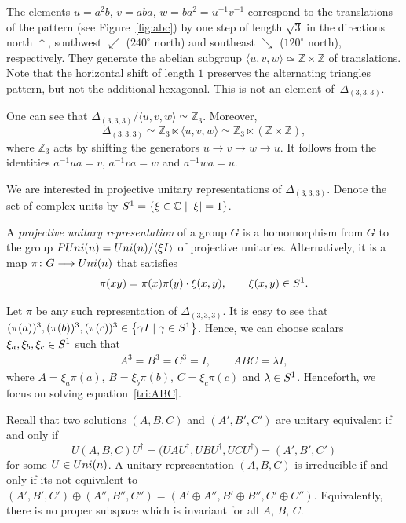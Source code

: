 \documentclass[11pt]{article}
\numberwithin{equation}{section}
\numberwithin{equation}{section}
\newcommand{\ea}[1]{\begin{align}#1\end{align}}
\newcommand{\la}{\langle}
\newcommand{\ra}{\rangle}
\newcommand{\mbb}{\mathbb}
\begin{document}
The elements $u=a^2b$, $v=aba$, $w=ba^2=u^{-1}v^{-1}$ correspond to the translations
of the pattern (see Figure~\ref{fig:abc}) by one step of length $\sqrt{3}$
in the directions north $\uparrow$,
southwest $\swarrow$ ($240^\circ$ north) and
southeast $\searrow$ ($120^\circ$ north), respectively.
They generate the abelian subgroup $\la u,v,w \ra \simeq \mbb{Z} \times \mbb{Z}$
of translations.
Note that the horizontal shift of length $1$ preserves the alternating triangles pattern,
but not the additional hexagonal. This is not an element of~$\Delta_{(3,3,3)}$.

One can see that
$\Delta_{(3,3,3)}/\la u,v,w \ra \simeq \mbb{Z}_3$.
Moreover,
\[
\Delta_{(3,3,3)} \simeq \mbb{Z}_3 \ltimes \la u,v,w \ra
\simeq \mbb{Z}_3 \ltimes (\mbb{Z} \times \mbb{Z}),
\]
where $\mbb{Z}_3$ acts by shifting the generators $u \rightarrow v \rightarrow w \rightarrow u$.
It follows from the identities $a^{-1}ua = v$, $a^{-1}va = w$ and $a^{-1}wa = u$.

We are interested in projective unitary representations of $\Delta_{(3,3,3)}$.
Denote the set of complex units by ${\rm S}^1 = \{\xi \in \mbb{C} \mid |\xi| = 1 \}$.

A \textit{projective unitary representation} of a group $G$
is a homomorphism from $G$ to the group
${\rm PUni}(n) = {\rm Uni}(n)/\la \xi I\ra$ of projective unitaries.
Alternatively, it is a map $\pi\colon G \longrightarrow {\rm Uni}(n)$ that satisfies
\begin{align*}
\pi(xy) = \pi(x)\pi(y) \cdot \xi(x, y),
\qquad
\xi(x, y) \in {\rm S}^1.
\end{align*}

Let $\pi$ be any such representation of $\Delta_{(3,3,3)}$.
It is easy to see that $(\pi(a))^3, (\pi(b))^3, (\pi(c))^3 \in \bigl\{ \gamma I \mid \gamma \in {\rm S}^1\bigr\}$.
Hence, we can choose scalars $\xi_a, \xi_b, \xi_c \in {\rm S}^1$ such that
\ea{\label{tri:ABC}
A^3 = B^3 = C^3 = I,\qquad ABC = \lambda I,
}
where $A = \xi_a\pi(a)$, $B = \xi_b\pi(b)$, $C = \xi_c\pi(c)$ and $\lambda \in {\rm S}^1$.
Henceforth, we focus on solving equation~\eqref{tri:ABC}.

Recall that two solutions $(A,B,C)$ and $(A',B',C')$
are unitary equivalent if and only if
\[
U(A,B,C)U^\dag = \bigl(UAU^\dag,UBU^\dag,UCU^\dag\bigr) = (A',B',C')
\]
for some $U \in {\rm Uni}(n)$.
A unitary representation $(A,B,C)$ is irreducible if and only if its not equivalent to
$(A',B',C') \oplus (A'',B'',C'') = (A'\oplus A'',B'\oplus B'',C'\oplus C'')$.
Equivalently, there is no proper subspace which is invariant for all $A$, $B$, $C$.
\end{document}
